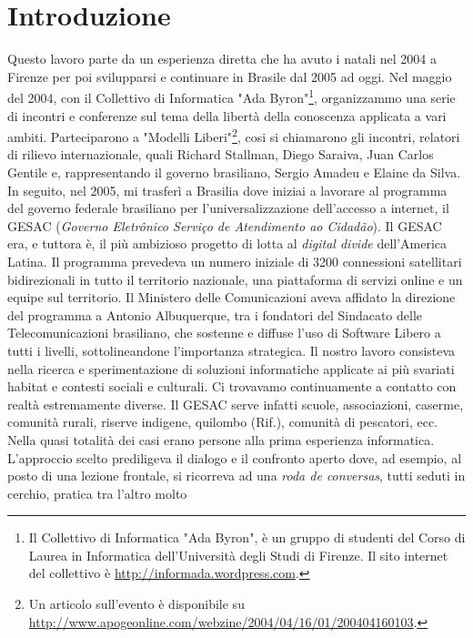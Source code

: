 
\chapter{Introduzione}
\label{Capitolo1}

Questo lavoro parte da un esperienza diretta che ha avuto i natali nel
2004 a Firenze per poi svilupparsi e continuare in Brasile dal 2005 ad
oggi. Nel maggio del 2004, con il Collettivo di Informatica "Ada
Byron"\footnote{Il Collettivo di Informatica "Ada Byron", è un gruppo
  di studenti del Corso di Laurea in Informatica dell’Università degli
  Studi di Firenze. Il sito internet del collettivo è
  \url{http://informada.wordpress.com}.}, organizzammo una serie di
incontri e conferenze sul tema della libertà della conoscenza
applicata a vari ambiti. Parteciparono a "Modelli Liberi"\footnote{Un
  articolo sull'evento è disponibile su
  \url{http://www.apogeonline.com/webzine/2004/04/16/01/200404160103}.},
cosi si chiamarono gli incontri, relatori di rilievo internazionale,
quali Richard Stallman, Diego Saraiva, Juan Carlos Gentile e,
rappresentando il governo brasiliano, Sergio Amadeu e Elaine da
Silva. In seguito, nel 2005, mi trasferì a Brasilia dove iniziai a
lavorare al programma del governo federale brasiliano per
l'universalizzazione dell'accesso a internet, il GESAC (\emph{Governo
  Eletrônico Serviço de Atendimento ao Cidadão}). Il GESAC era, e
tuttora è, il più ambizioso progetto di lotta al \emph{digital divide}
dell'America Latina. Il programma prevedeva un numero iniziale di 3200
connessioni satellitari bidirezionali in tutto il territorio
nazionale, una piattaforma di servizi online e un equipe sul
territorio. Il Ministero delle Comunicazioni aveva affidato la
direzione del programma a Antonio Albuquerque, tra i fondatori del
Sindacato delle Telecomunicazioni brasiliano, che sostenne e diffuse
l'uso di Software Libero a tutti i livelli, sottolineandone
l'importanza strategica. Il nostro lavoro consisteva nella ricerca e
sperimentazione di soluzioni informatiche applicate ai più svariati
habitat e contesti sociali e culturali. Ci trovavamo continuamente a
contatto con realtà estremamente diverse. Il GESAC serve infatti
scuole, associazioni, caserme, comunità rurali, riserve indigene,
quilombo (Rif.), comunità di pescatori, ecc. Nella quasi totalità dei
casi erano persone alla prima esperienza informatica. L'approccio
scelto prediligeva il dialogo e il confronto aperto dove, ad esempio,
al posto di una lezione frontale, si ricorreva ad una \emph{roda de
  conversas}, tutti seduti in cerchio, pratica tra l'altro molto
